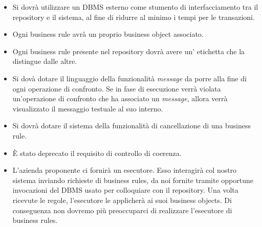 \documentclass[11pt,titlepage,a4paper]{report}
\begin{document}
\begin{itemize}

\item Si dovr\`a utilizzare un DBMS esterno come stumento di interfacciamento tra il repository e il sistema, al fine di ridurre al minimo i tempi per le transazioni.

\item Ogni business rule avr\`a un proprio business object associato.

\item Ogni business rule presente nel repository dovr\`a avere un' etichetta che la distingue dalle altre.

\item Si dov\`a dotare il linguaggio della funzionalit\`a \textit{message} da porre alla fine di ogni operazione di confronto. Se in fase di esecuzione verr\`a violata un'operazione di confronto che ha associato un \textit{message}, allora verr\`a visualizzato il messaggio testuale al suo interno.

\item Si dovr\`a dotare il sistema della funzionalit\`a di cancellazione di una business rule.

\item \`E stato deprecato il requisito di controllo di coerenza.

\item L'azienda proponente ci fornir\`a un esecutore. Esso interagir\`a col nostro sistema inviando richieste di business rules, da noi fornite tramite opportune invocazioni del DBMS usato per colloquiare con il repository. Una volta ricevute le regole, l'esecutore le applicher\`a ai suoi business objects. Di conseguenza non dovremo pi\`u preoccuparci di realizzare l'esecutore di business rules.
\end{itemize}
\end{document}
